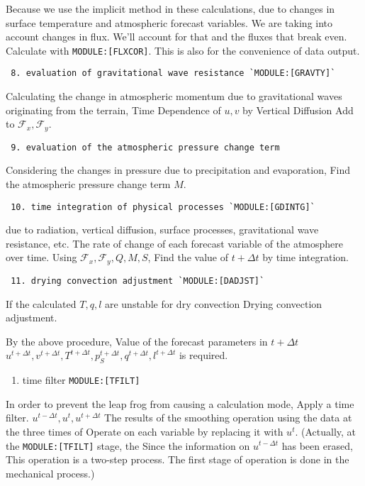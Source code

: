 Because we use the implicit method in these calculations, due to changes
in surface temperature and atmospheric forecast variables. We are taking
into account changes in flux. We'll account for that and the fluxes that
break even. Calculate with \texttt{MODULE:{[}FLXCOR{]}}. This is also
for the convenience of data output.

\begin{verbatim}
 8. evaluation of gravitational wave resistance `MODULE:[GRAVTY]`
\end{verbatim}

Calculating the change in atmospheric momentum due to gravitational
waves originating from the terrain, Time Dependence of \(u, v\) by
Vertical Diffusion Add to \({\mathcal F}_x, {\mathcal F}_y\).

\begin{verbatim}
 9. evaluation of the atmospheric pressure change term
\end{verbatim}

Considering the changes in pressure due to precipitation and
evaporation, Find the atmospheric pressure change term \(M\).

\begin{verbatim}
 10. time integration of physical processes `MODULE:[GDINTG]`
\end{verbatim}

due to radiation, vertical diffusion, surface processes, gravitational
wave resistance, etc. The rate of change of each forecast variable of
the atmosphere over time. Using
\({\mathcal F}_x, {\mathcal F}_y, Q, M, S\), Find the value of
\(t+\Delta t\) by time integration.

\begin{verbatim}
 11. drying convection adjustment `MODULE:[DADJST]`
\end{verbatim}

If the calculated \(T, q, l\) are unstable for dry convection Drying
convection adjustment.

By the above procedure, Value of the forecast parameters in
\(t+\Delta t\)
\(u^{t+\Delta t}, v^{t+\Delta t}, T^{t+\Delta t}, p_S^{t+\Delta t}, q^{t+\Delta t}, l^{t+\Delta t}\)
is required.

\begin{enumerate}
\def\labelenumi{\arabic{enumi}.}
\setcounter{enumi}{5}
\tightlist
\item
  time filter \texttt{MODULE:{[}TFILT{]}}
\end{enumerate}

In order to prevent the leap frog from causing a calculation mode, Apply
a time filter. \(u^{t-\Delta t}, u^{t}, u^{t+\Delta t}\) The results of
the smoothing operation using the data at the three times of Operate on
each variable by replacing it with \(u^{t}\). (Actually, at the
\texttt{MODULE:{[}TFILT{]}} stage, the Since the information on
\(u^{t-\Delta t}\) has been erased, This operation is a two-step
process. The first stage of operation is done in the mechanical
process.)
